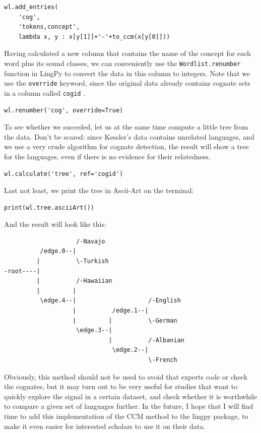 \documentclass[
  english,
  a4paper,
  oneside,tablecaptionabove
]{scrbook}
\newcommand{\passthrough}[1]{#1}
\begin{document}
\begin{lstlisting}
wl.add_entries(
    'cog', 
    'tokens,concept', 
    lambda x, y : x[y[1]]+'-'+to_ccm(x[y[0]]))
\end{lstlisting}

Having calculated a new column that contains the name of the concept for
each word plus its sound classes, we can conveniently use the
\passthrough{\lstinline!Wordlist.renumber!} function in LingPy to
convert the data in this column to integers. Note that we use the
\passthrough{\lstinline!override!} keyword, since the original data
already contains cognate sets in a column called
\passthrough{\lstinline!cogid!} .

\begin{lstlisting}
wl.renumber('cog', override=True)
\end{lstlisting}

To see whether we succeded, let us at the same time compute a little
tree from the data. Don't be scared: since Kessler's data contains
unrelated languages, and we use a very crude algorithm for cognate
detection, the result will show a tree for the languages, even if there
is no evidence for their relatedness.

\begin{lstlisting}
wl.calculate('tree', ref='cogid')
\end{lstlisting}

Last not least, we print the tree in Ascii-Art on the terminal:

\begin{lstlisting}
print(wl.tree.asciiArt())
\end{lstlisting}

And the result will look like this:

\begin{lstlisting}
                    /-Navajo
          /edge.0--|
         |          \-Turkish
-root----|
         |          /-Hawaiian
         |         |
          \edge.4--|                    /-English
                   |          /edge.1--|
                   |         |          \-German
                    \edge.3--|
                             |          /-Albanian
                              \edge.2--|
                                        \-French
\end{lstlisting}

Obviously, this method should not be used to avoid that experts code or
check the cognates, but it may turn out to be very useful for studies
that want to quickly explore the signal in a certain dataset, and check
whether it is worthwhile to compare a given set of languages further. In
the future, I hope that I will find time to add this implementation of
the CCM method to the lingpy package, to make it even easier for
interested scholars to use it on their data.
\end{document}
